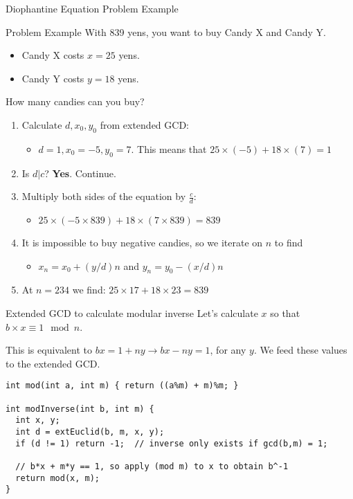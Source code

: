 \begin{frame}{Diophantine Equation Problem Example}
    \begin{block}{Problem Example}
      With 839 yens, you want to buy Candy X and Candy Y.
      \begin{itemize}
        \item Candy X costs $x=25$ yens.
        \item Candy Y costs $y=18$ yens.
      \end{itemize}
      How many candies can you buy?
    \end{block}

    \begin{enumerate}
      \item Calculate $d, x_0, y_0$ from extended GCD:
      \begin{itemize}
        \item $d = 1, x_0 = -5, y_0 = 7$. This means that $25\times(-5) + 18\times(7) = 1$
      \end{itemize}
      \item Is $d|c$? {\bf Yes}. Continue.
      \item Multiply both sides of the equation by $\frac{c}{d}$:
      \begin{itemize}
        \item $25 \times (-5 \times 839) + 18\times(7 \times 839) = 839$
      \end{itemize}
      \item It is impossible to buy negative candies, so we iterate on $n$ to find
      \begin{itemize}
        \item $x_n = x_0 + (y/d)n$ and $y_n = y_0 - (x/d)n$
      \end{itemize}
      \item At $n = 234$ we find: $25 \times 17 + 18 \times 23 = 839$
    \end{enumerate}
\end{frame}

\begin{frame}[fragile]{Extended GCD to calculate modular inverse}
  Let's calculate $x$ so that $b\times x \equiv 1 \mod n$.\medskip

  This is equivalent to $bx = 1 + ny \to bx - ny = 1$, for any $y$. We feed
  these values to the extended GCD.
  \begin{block}{}
\begin{verbatim}
int mod(int a, int m) { return ((a%m) + m)%m; }

int modInverse(int b, int m) {
  int x, y;
  int d = extEuclid(b, m, x, y);
  if (d != 1) return -1;  // inverse only exists if gcd(b,m) = 1;

  // b*x + m*y == 1, so apply (mod m) to x to obtain b^-1
  return mod(x, m);
}
\end{verbatim}
  \end{block}
\end{frame}
